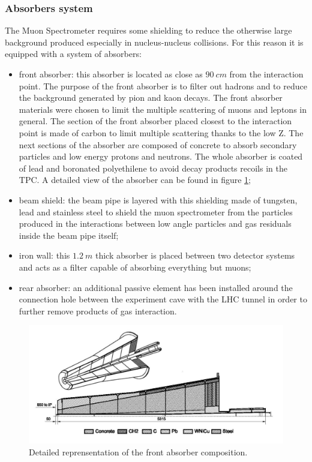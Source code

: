 \subsubsection{Absorbers system}
The Muon Spectrometer requires some shielding to reduce the otherwise large background produced especially in nucleus-nucleus collisions.
For this reason it is equipped with a system of absorbers:
\begin{itemize}
    \item front absorber: this absorber is located as close as $90\ cm$ from the interaction point. The purpose of the front absorber is to filter out hadrons and to reduce the background generated by pion and kaon decays. The front absorber materials were chosen to limit the multiple scattering of muons and leptons in general. The section of the front absorber placed closest to the interaction point is made of carbon to limit multiple scattering thanks to the low Z. The next sections of the absorber are composed of concrete to absorb secondary particles and low energy protons and neutrons. The whole absorber is coated of lead and boronated polyethilene to avoid decay products recoils in the TPC. A detailed view of the absorber can be found in figure \ref{fig:absorber};
    \item beam shield: the beam pipe is layered with this shielding made of tungsten, lead and stainless steel to shield the muon spectrometer from the particles produced in the interactions between low angle particles and gas residuals inside the beam pipe itself;
    \item iron wall: this $1.2\ m$ thick absorber is placed between two detector systems and acts as a filter capable of absorbing everything but muons;
    \item rear absorber: an additional passive element has been installed around the connection hole between the experiment cave with the LHC tunnel in order to further remove products of gas interaction.
\end{itemize}

\begin{figure}[!h]
\begin{center}
\includegraphics[width=0.7\linewidth]{Chapters/Introduction/Figs/absorber.pdf}
\caption{Detailed reprensentation of the front absorber composition.}
\label{fig:absorber}
\end{center}
\end{figure}

